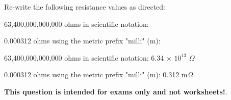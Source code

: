 

Re-write the following resistance values as directed:

\vskip 10pt

63,400,000,000,000 ohms in scientific notation: \underbar{\hskip 100pt}

\vskip 10pt

0.000312 ohms using the metric prefix "milli" (m): \underbar{\hskip 100pt}







\vskip 10pt

63,400,000,000,000 ohms in scientific notation: 6.34 $\times$ $10^{13}$ $\Omega$

\vskip 10pt

0.000312 ohms using the metric prefix "milli" (m): 0.312 m$\Omega$







{\bf This question is intended for exams only and not worksheets!}.



